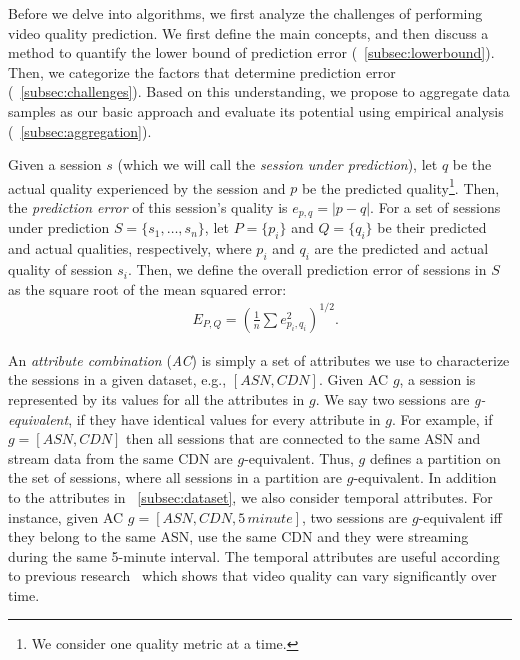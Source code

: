 \label{sec:challenges}

Before we delve into algorithms, we first analyze the challenges of
performing video quality prediction. We first define the main
concepts, and then discuss a method to quantify the lower bound of
prediction error (\Section~\ref{subsec:lowerbound}). Then, we
categorize the factors that determine prediction error
(\Section~\ref{subsec:challenges}). Based on this understanding, we
propose to aggregate data samples as our basic approach and evaluate
its potential using empirical analysis
(\Section~\ref{subsec:aggregation}).

\label{subsec:lowerbound}

Given a session $s$ (which we will call the {\it session under
prediction}), let $q$ be the actual quality experienced by the session 
and $p$ be the predicted
quality\footnote{We consider one quality metric at a time.}. Then, the
{\it prediction error} of this session's quality is $e_{p,q}=|p-q|$.
For a set of sessions under prediction $S=\{s_1,\dots,s_n\}$, let
$P=\{p_i\}$ and $Q=\{q_i\}$ be their predicted and actual qualities,
respectively, where $p_i$ and $q_i$ are the predicted and actual
quality of session $s_i$. Then, we define the overall prediction error
of sessions in $S$ as the square root of the mean squared error:
\begin{align}
&E_{P,Q}=\left(\frac{1}{n}\sum e_{p_i,q_i}^2\right)^{1/2}.
\end{align}

 An {\it attribute
  combination} ({\it AC}) is simply a set of attributes we use to
characterize the sessions in a given dataset, e.g., $[ASN,
CDN]$. Given AC $g$, a session is represented by its values for all
the attributes in $g$. We say two sessions are {\it g-equivalent}, if
they have identical values for every attribute in $g$. For example, if
$g=[ASN,CDN]$ then all sessions that are connected to the same ASN and
stream data from the same CDN are $g$-equivalent. Thus, $g$ defines a
partition on the set of sessions, where all sessions in a partition
are $g$-equivalent. In addition to the attributes in
\Section~\ref{subsec:dataset}, we also consider temporal
attributes. For instance, given AC $g=[ASN, CDN, 5\,minute]$, two
sessions are $g$-equivalent iff they belong to the same ASN, use the
same CDN and they were streaming during the same 5-minute
interval. The temporal attributes are useful according to previous
research~\cite{sigcomm12} which shows that video quality can vary
significantly over time.

